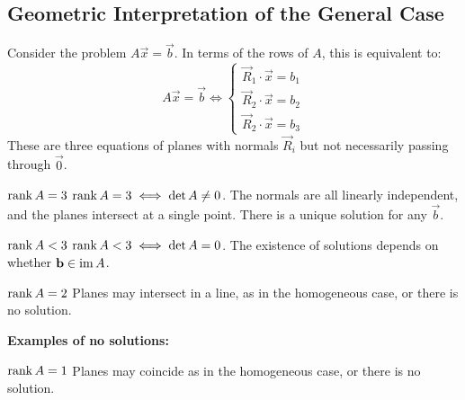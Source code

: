 \documentclass[../main.tex]{subfiles}
\begin{document}
\subsection{Geometric Interpretation of the General Case}
Consider the problem $A\vec{x} = \vec{b}$.
In terms of the rows of $A$, this is equivalent to:
\[
  A \vec{x} = \vec{b} \iff \begin{cases}
  \vec{R}_1 \cdot \vec{x} = b_1 \\
  \vec{R}_2 \cdot \vec{x} = b_2 \\
  \vec{R}_2 \cdot \vec{x} = b_3
  \end{cases}
\]
These are three equations of planes with normals $\vec{R}_i$ but not necessarily passing through $\vec{0}$.
\begin{proofcases}
  \begin{case}{$\operatorname{rank} A = 3$}
    $\operatorname{rank} A = 3 \iff \det A \neq 0$.
    The normals are all linearly independent, and the planes intersect at a single point.
    There is a unique solution for any $\vec{b}$.
  \end{case}
  \begin{case}{$\operatorname{rank} A < 3$}
    $\operatorname{rank} A < 3 \iff \det A = 0$.
    The existence of solutions depends on whether $\mathbf{\bm{b}} \in \operatorname{im} A$.
    \begin{proofcases}
      \begin{case}{$\operatorname{rank} A = 2$}
        Planes may intersect in a line, as in the homogeneous case, or there is no solution.

        \textbf{Examples of no solutions:}
        \begin{center}
        \end{center}
      \end{case}
      \begin{case}{$\operatorname{rank} A = 1$}
        Planes may coincide as in the homogeneous case, or there is no solution.


\end{case}
\end{proofcases}
\end{case}
\end{proofcases}
\end{document}
